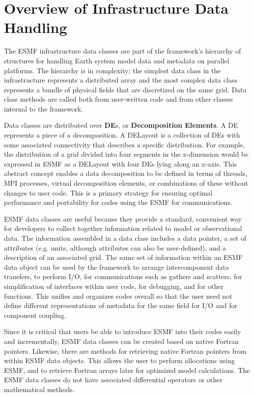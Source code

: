 
\section{Overview of Infrastructure Data Handling}

The ESMF infrastructure data classes are part of the framework's 
hierarchy of structures for handling Earth system model data and 
metadata on parallel platforms.  The hierarchy is in complexity; the 
simplest data class in the infrastructure represents a distributed 
array and the most complex data class represents a bundle of physical 
fields that are discretized on the same grid.  Data class methods 
are called both from user-written code and from other classes 
internal to the framework. 

Data classes are distributed over {\bf DE}s, or {\bf Decomposition Elements}.  
A DE represents a piece of a decomposition.  A DELayout is a collection
of DEs with some associated connectivity that describes a specific 
distribution.  For example, the distribution of a grid divided 
into four segments in the x-dimension would be expressed in ESMF as
a DELayout with four DEs lying along an x-axis. This abstract concept 
enables a data decomposition to be defined in 
terms of threads, MPI processes, virtual decomposition elements, or
combinations of these without changes to user code.  This is a
primary strategy for ensuring optimal performance and portability
for codes using the ESMF for communications.

ESMF data classes are useful because they provide a standard, 
convenient way for developers to collect together information 
related to model or observational data.  The information assembled 
in a data class includes a data pointer, a set of attributes 
(e.g. units, although attributes can also be user-defined), and a 
description of an associated grid.  The same set of information within 
an ESMF data object can be used by the framework to arrange 
intercomponent data transfers, to perform I/O, for communications
such as gathers and scatters, for simplification of interfaces 
within user code, for debugging, and for other functions.  
This unifies and organizes codes overall so that the user need not
define different representations of metadata for the same field 
for I/O and for component coupling.  

Since it is critical that users be able to introduce ESMF into their
codes easily and incrementally, ESMF data classes can be created based 
on native Fortran pointers.  Likewise, there are methods for retrieving 
native Fortran pointers from within ESMF data objects.  This allows
the user to perform allocations using ESMF, and to retrieve Fortran
arrays later for optimized model calculations.  The ESMF data classes 
do not have associated differential operators or other mathematical 
methods.

